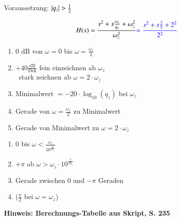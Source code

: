 \begin{minipage}[t]{0.48\columnwidth}
    \raggedright
    \begin{center}
        Voraussetzung: $\left|q_z\right| > \frac{1}{2}$
    \end{center}
    $$ H(s) = \frac{s^2 + s \frac{\omega_z}{q_z} + \omega_z^2}{\omega_z^2} {\color{blue}= \frac{s^2 + s \frac{2}{3} + 2^2}{2^2}} $$

    
\end{minipage}
\hfill
\begin{minipage}[t]{0.48\columnwidth}
        \begin{enumerate}
            \item 0 $\text{dB}$ von $\omega=0$ bis $\omega=\frac{\omega_z}{2}$
            \item $+40\frac{\text{dB}}{\text{Dek}}$ fein einzeichnen ab $\omega_z$\\
            \textrightarrow\ stark zeichnen ab $\omega = 2 \cdot \omega_z$
            \item Minimalwert $= -20\cdot \log_{10}(q_z)$ bei $\omega_z$
            \item Gerade von $\omega=\frac{\omega_z}{2}$ zu Minimalwert 
            \item Gerade von Minimalwert zu $\omega = 2 \cdot \omega_z$\\
        \end{enumerate}
        \begin{enumerate}
            \item 0 bis $\omega < \frac{\omega_z}{10^{\frac{1}{2 q_z}}}$
            \item $+ \pi$ ab $\omega > \omega_z \cdot 10^{\frac{1}{2 q_z}}$
            \item Gerade zwischen $0$ und $- \pi$ Geraden
            \item ($\frac{\pi}{2}$ bei $\omega = \omega_z$)\\
        \end{enumerate}
\end{minipage}

\textbf{Hinweis: Berechnungs-Tabelle aus Skript, S. 235} 

\begingroup
\renewcommand{\arraystretch}{2}
\setlength{\tabcolsep}{0mm}
\endgroup
\renewcommand{\arraystretch}{1}

